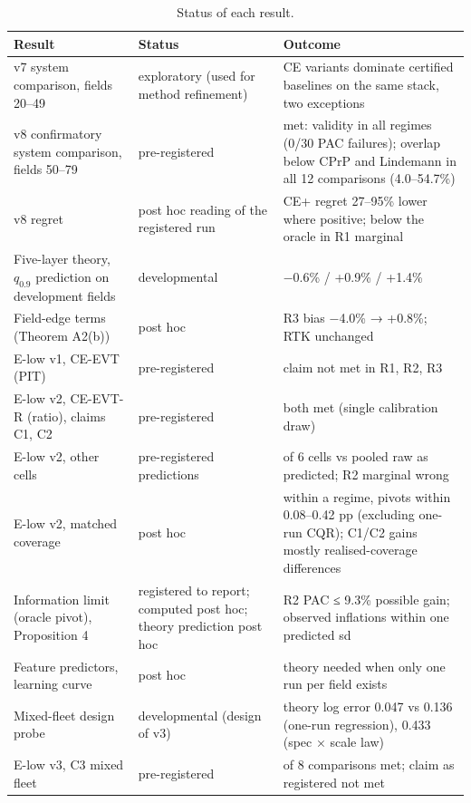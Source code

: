 \documentclass[preprint,12pt,authoryear]{elsarticle}
\begin{document}
\begin{table}[!htbp]
\centering
\footnotesize
\renewcommand{\thetable}{S20}\caption{Status of each result.}
\begin{tabularx}{\textwidth}{@{}>{\raggedright\arraybackslash\hsize=1.00\hsize}X>{\raggedright\arraybackslash\hsize=1.00\hsize}X>{\raggedright\arraybackslash\hsize=1.00\hsize}X@{}}
\toprule
\textbf{Result} & \textbf{Status} & \textbf{Outcome} \\
\midrule
v7 system comparison, fields 20--49 & exploratory (used for method refinement) & CE variants dominate certified baselines on the same stack, two exceptions \\
v8 confirmatory system comparison, fields 50--79 & pre-registered & met: validity in all regimes (0/30 PAC failures); overlap below CPrP and Lindemann in all 12 comparisons (4.0--54.7\%) \\
v8 regret & post hoc reading of the registered run & CE+ regret 27--95\% lower where positive; below the oracle in R1 marginal \\
Five-layer theory, \(q_{0.9}\) prediction on development fields & developmental & −0.6\% / +0.9\% / +1.4\% \\
Field-edge terms (Theorem A2(b)) & post hoc & R3 bias −4.0\% → +0.8\%; RTK unchanged \\
E-low v1, CE-EVT (PIT) & pre-registered & claim not met in R1, R2, R3 \\
E-low v2, CE-EVT-R (ratio), claims C1, C2 & pre-registered & both met (single calibration draw) \\
E-low v2, other cells & pre-registered predictions & 5 of 6 cells vs pooled raw as predicted; R2 marginal wrong \\
E-low v2, matched coverage & post hoc & within a regime, pivots within 0.08--0.42 pp (excluding one-run CQR); C1/C2 gains mostly realised-coverage differences \\
Information limit (oracle pivot), Proposition 4 & registered to report; computed post hoc; theory prediction post hoc & R2 PAC ≤ 9.3\% possible gain; observed inflations within one predicted sd \\
Feature predictors, learning curve & post hoc & theory needed when only one run per field exists \\
Mixed-fleet design probe & developmental (design of v3) & theory log error 0.047 vs 0.136 (one-run regression), 0.433 (spec × scale law) \\
E-low v3, C3 mixed fleet & pre-registered & 5 of 8 comparisons met; claim as registered not met \\

\end{tabularx}
\end{table}
\end{document}
